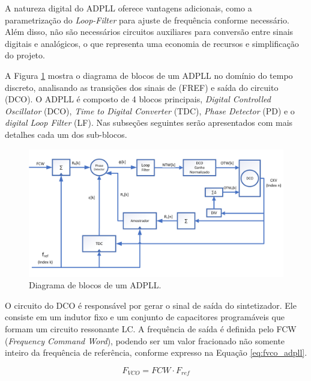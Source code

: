 A natureza digital do ADPLL oferece vantagens adicionais, como a parametrização do \textit{Loop-Filter} para ajuste de frequência conforme necessário. Além disso, não são necessários circuitos auxiliares para conversão entre sinais digitais e analógicos, o que representa uma economia de recursos e simplificação do projeto.

A Figura \ref{fig:adpll_block_diagram} mostra o diagrama de blocos de um ADPLL no domínio do tempo discreto, analisando as transições dos sinais de (FREF) e saída do circuito (DCO). O ADPLL é composto de 4 blocos principais,  \textit{Digital Controlled Oscillator} (DCO), \textit{Time to Digital Converter} (TDC), \textit{Phase Detector} (PD) e o \textit{ digital Loop Filter} (LF). Nas subseções seguintes serão apresentados com mais detalhes cada um dos sub-blocos. 

\begin{figure}[htb]
	\caption{Diagrama de blocos de um ADPLL.}
	\begin{center}
		\includegraphics[scale=1.3]{img/blocos_ADPLL.png}
	\end{center}
	\label{fig:adpll_block_diagram}
\end{figure}

O circuito do DCO é responsável por gerar o sinal de saída do sintetizador. Ele consiste em um indutor fixo e um conjunto de capacitores programáveis que formam um circuito ressonante LC. A frequência de saída é definida pelo FCW (\textit{Frequency Command Word}), podendo ser um valor fracionado não somente inteiro da frequência de referência, conforme expresso na Equação \ref{eq:fvco_adpll}.

\begin{equation}
	F_{VCO} = FCW \cdot F_{ref}
	\label{eq:fvco_adpll}
\end{equation}

